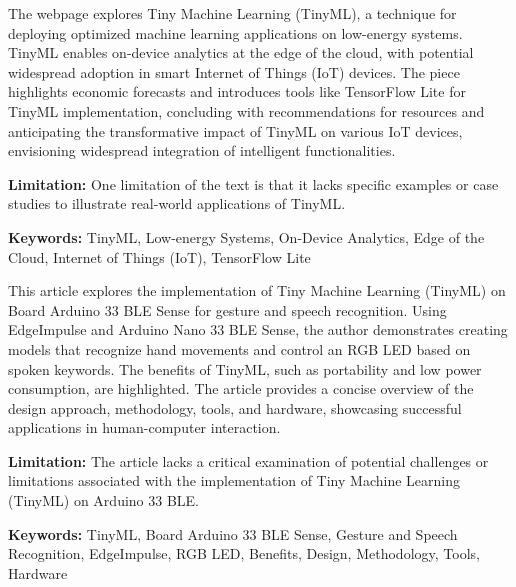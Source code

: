 { 
	The webpage \cite{Ribeiro:2020} explores Tiny Machine Learning (TinyML), a technique for deploying optimized machine learning applications on low-energy systems. TinyML enables on-device analytics at the edge of the cloud, with potential widespread adoption in smart Internet of Things (IoT) devices. The piece highlights economic forecasts and introduces tools like TensorFlow Lite for TinyML implementation, concluding with recommendations for resources and anticipating the transformative impact of TinyML on various IoT devices, envisioning widespread integration of intelligent functionalities.
	
	\bigskip
	
	\textbf{Limitation:} One limitation of the text is that it lacks specific examples or case studies to illustrate real-world applications of TinyML. 
	
	\scriptsize{\textbf{Keywords:} TinyML, Low-energy Systems, On-Device Analytics, Edge of the Cloud, Internet of Things (IoT), TensorFlow Lite}
}


{ 
	This article \cite{Viswanatha:2022} explores the implementation of Tiny Machine Learning (TinyML) on Board Arduino 33 BLE Sense for gesture and speech recognition. Using EdgeImpulse and Arduino Nano 33 BLE Sense, the author demonstrates creating models that recognize hand movements and control an RGB LED based on spoken keywords. The benefits of TinyML, such as portability and low power consumption, are highlighted. The article provides a concise overview of the design approach, methodology, tools, and hardware, showcasing successful applications in human-computer interaction.
	
	\bigskip
	
	\textbf{Limitation:} The article lacks a critical examination of potential challenges or limitations associated with the implementation of Tiny Machine Learning (TinyML) on Arduino 33 BLE. 
	
	\scriptsize{\textbf{Keywords:} TinyML, Board Arduino 33 BLE Sense, Gesture and Speech Recognition, EdgeImpulse, RGB LED, Benefits, Design, Methodology, Tools, Hardware}
}


